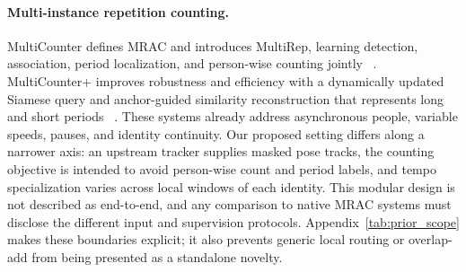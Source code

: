 \paragraph{Multi-instance repetition counting.}
MultiCounter defines MRAC and introduces MultiRep, learning detection,
association, period localization, and person-wise counting jointly
~\cite{tang2024multicounter}. MultiCounter+ improves robustness and efficiency
with a dynamically updated Siamese query and anchor-guided similarity
reconstruction that represents long and short periods
~\cite{tang2026multicounterplus}. These systems already address asynchronous
people, variable speeds, pauses, and identity continuity. Our proposed setting
differs along a narrower axis: an upstream tracker supplies masked pose tracks,
the counting objective is intended to avoid person-wise count and period
labels, and tempo specialization varies across local windows of each identity.
This modular design is not described as end-to-end, and any comparison to
native MRAC systems must disclose the different input and supervision
protocols. Appendix~\ref{tab:prior_scope} makes these boundaries explicit; it
also prevents generic local routing or overlap-add from being presented as a
standalone novelty.

